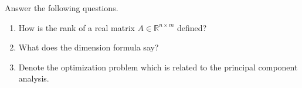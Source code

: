 Answer the following questions.
\begin{enumerate}
	\item How is the rank of a real matrix $A \in \mathbb{R}^{n \times m}$ defined?
	
	\item What does the dimension formula say?
	
	\item Denote the optimization problem which is related to the principal component analysis.
	
\end{enumerate}